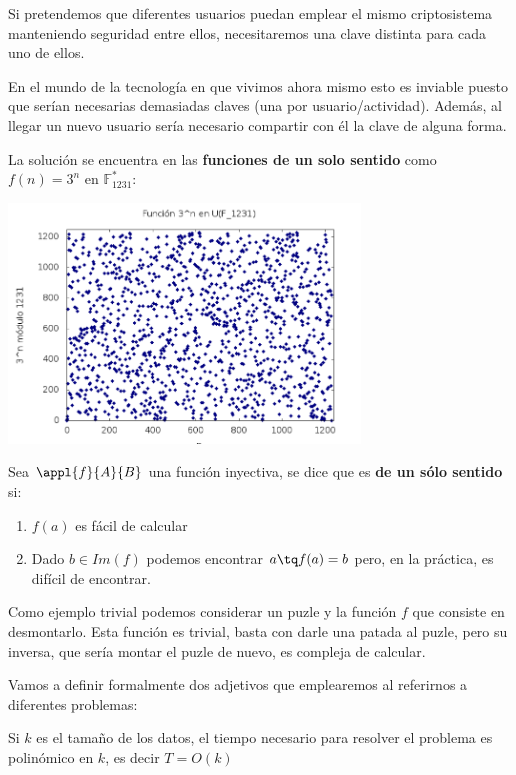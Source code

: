 Si pretendemos que diferentes usuarios puedan emplear el mismo criptosistema manteniendo seguridad entre ellos, necesitaremos una clave distinta para cada uno de ellos.

En el mundo de la tecnología en que vivimos ahora mismo esto es inviable puesto que serían necesarias demasiadas claves (una por usuario/actividad). Además, al llegar un nuevo usuario sería necesario compartir con él la clave de alguna forma.

\newpage
La solución se encuentra en las \textbf{funciones de un solo sentido} como $f(n)=3^{n}$ en $\mathbb{F}_{1231}^*$:
\begin{center}
\includegraphics[width=0.7\textwidth]{img/3nF1231.png}
\end{center}

\begin{defn}
Sea $\appl{f}{A}{B}$ una función inyectiva, se dice que es \textbf{de un sólo sentido} si:
\begin{enumerate}
\item $f(a)$ es fácil de calcular
\item Dado $b \in Im(f)$ podemos encontrar $a\tq f(a) = b$ pero, en la práctica, es difícil de encontrar.
\end{enumerate}
\end{defn}

Como ejemplo trivial podemos considerar un puzle y la función $f$ que consiste en desmontarlo. Esta función es trivial, basta con darle una patada al puzle, pero su inversa, que sería montar el puzle de nuevo, es compleja de calcular.

Vamos a definir formalmente dos adjetivos que emplearemos al referirnos a diferentes problemas:

\begin{defn}[Fácil]
Si $k$ es el tamaño de los datos, el tiempo necesario para resolver el problema es polinómico en $k$, es decir $T=O(k)$
\end{defn}

